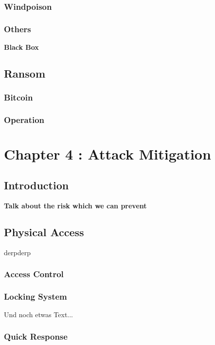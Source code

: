 \documentclass[twosided,a4,10pt]{article}
\begin{document}
\begin{multicols}{2}
 \subsubsection{Windpoison}
 \lipsum[1]
 \subsubsection{Others}
 \textbf{Black Box}
 \lipsum[1]
 
\subsection{Ransom}
 \subsubsection{Bitcoin}
 \lipsum[1]
 \subsubsection{Operation}
 \lipsum[1]



\section{Chapter 4 : Attack Mitigation }

\subsection{Introduction}
 \textbf{Talk about the risk which we can prevent}
 \lipsum[1]



\subsection{Physical Access}
derpderp
 \subsubsection{Access Control}
 \lipsum[1]

 \subsubsection{Locking System}
 Und noch etwas Text... \cite{muster} \newline
 \lipsum[1]
 \subsubsection{Quick Response}
 \lipsum[1]


\end{multicols}
\end{document}
